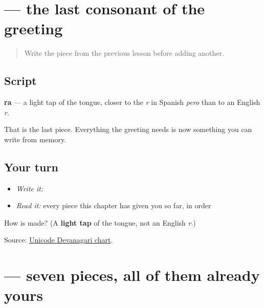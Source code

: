 \section[\texorpdfstring{\mr{र} (ra)}{र (ra)}]{ — the last consonant of the greeting}

\label{lesson:MR-W01-ra}



\begin{quote}
Write the piece from the previous lesson before adding another.
\end{quote}

\subsection*{Script}

\begin{quote}
\end{quote}

\textbf{ra} — a light tap of the tongue, closer to the \emph{r} in Spanish \emph{pero} than to an English \emph{r}.

That is the last piece. Everything the greeting needs is now something you can write from memory.

\subsection*{Your turn}
\begin{itemize}
\raggedright
  \item \emph{Write it:} 
  \item \emph{Read it:} every piece this chapter has given you so far, in order
\end{itemize}

\begin{tcolorbox}[breakable,colback=teal!4,colframe=teal!35!black,title={Before you move on}]
How is \textbf{} made? (A \textbf{light tap} of the tongue, not an English \emph{r}.)

Source: \href{https://www.unicode.org/charts/PDF/U0900.pdf}{Unicode Devanagari chart}.
\end{tcolorbox}
\section[\texorpdfstring{\mr{नमस्कार} (namaskār)}{नमस्कार (namaskār)}]{ — seven pieces, all of them already yours}

